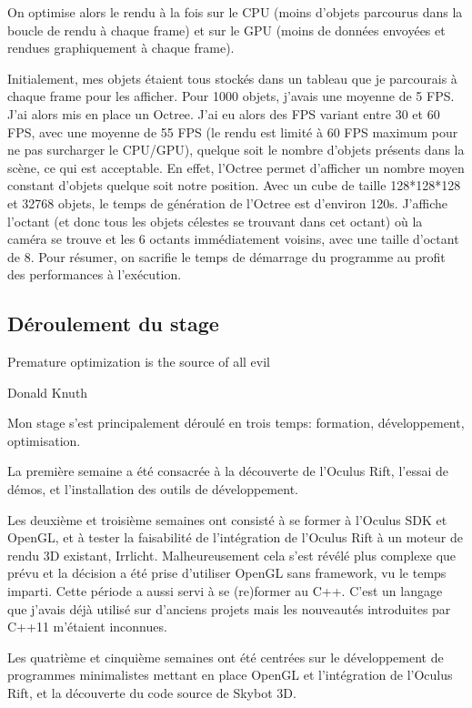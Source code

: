 \documentclass[a4paper,french,12pt]{article}
\begin{document}
		  
		On optimise alors le rendu à la fois sur le CPU (moins d'objets parcourus dans la boucle
			      de rendu à chaque frame) et sur le GPU (moins de données envoyées et 
			      rendues graphiquement à chaque frame).  
				
		
		Initialement, mes objets étaient tous stockés dans un tableau que je parcourais à chaque frame pour les afficher.
		Pour 1000 objets, j'avais une moyenne de 5 FPS. 
		J'ai alors mis en place un Octree. J'ai eu alors des FPS variant entre 30 et 60 FPS, avec une moyenne de 55 FPS
		(le rendu est limité à 60 FPS maximum
		pour ne pas surcharger le CPU/GPU), quelque soit le nombre d'objets présents dans la scène, ce qui est acceptable.
		En effet, l'Octree permet d'afficher un nombre moyen constant d'objets quelque soit notre position.
		Avec un cube de taille 128*128*128 et 32768 objets, le temps de génération de l'Octree est d'environ 120s.
		J'affiche l'octant (et donc tous les objets célestes se trouvant dans cet octant) où la caméra se trouve
		et les 6 octants immédiatement voisins, avec une taille d'octant de 8.
		Pour résumer, on sacrifie le temps de démarrage du programme au profit des performances à l'exécution.


	
		
	\subsection{Déroulement du stage}
	
	   \epigraph{Premature optimization is the source of all evil}{Donald Knuth}
	   
		Mon stage s'est principalement déroulé en trois temps: formation, développement, optimisation.
		
		La première semaine a été consacrée à la découverte de l'Oculus Rift, l'essai de démos, et l'installation
		des outils de développement.
		
		Les deuxième et troisième semaines ont consisté à se former à l'Oculus SDK et OpenGL, et à tester la
		faisabilité de l'intégration de l'Oculus Rift à un moteur de rendu 3D existant, Irrlicht. Malheureusement 
		cela s'est révélé plus complexe que prévu et la décision a été prise d'utiliser OpenGL sans framework,
		vu le temps imparti.
		Cette période a aussi servi à se (re)former au C++. C'est un langage que j'avais déjà utilisé sur d'anciens
		projets mais les nouveautés introduites par C++11 m'étaient inconnues.
		
		Les quatrième et cinquième semaines ont été centrées sur le développement de programmes minimalistes mettant
		en place OpenGL et l'intégration de l'Oculus Rift, et la découverte du code source de Skybot 3D.
		
\end{document}
